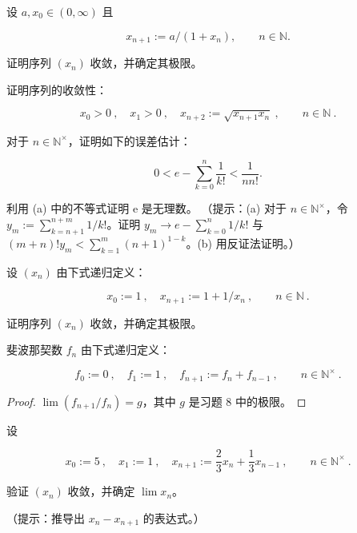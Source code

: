 \begin{exercises}
\item[5.]

设  $ a, x_0 \in (0, \infty) $ 且

\[
x_{n+1}:=a/(1+x_{n}),\qquad n\in\mathbb{N}.
\]

证明序列  $ (x_{n}) $ 收敛，并确定其极限。

\item[6.]

证明序列的收敛性：

\[
x_{0}>0~,\quad x_{1}>0~,\quad x_{n+2}:=\sqrt{x_{n+1}x_{n}}~,\qquad n\in\mathbb{N}~.
\]
\item[7.]

\begin{items}
\item

对于  $ n \in \mathbb{N}^\times $，证明如下的误差估计：

\[
0<e-\sum_{k=0}^{n}\frac{1}{k!}<\frac{1}{nn!}.
\]
\item

利用 (a) 中的不等式证明 e 是无理数。
（提示：(a) 对于  $ n \in \mathbb{N}^\times $，令  $ y_m := \sum_{k=n+1}^{n+m} 1/k! $。证明  $ y_m \to e - \sum_{k=0}^n 1/k! $ 与  $ (m+n)! y_m < \sum_{k=1}^m (n+1)^{1-k} $。(b) 用反证法证明。）

\end{items}

\item[8.]

设  $ (x_{n}) $ 由下式递归定义：

\[
x_{0}:=1~,\quad x_{n+1}:=1+1/x_{n}~,\qquad n\in\mathbb{N}~.
\]

证明序列  $ (x_{n}) $ 收敛，并确定其极限。

\item[9.]

斐波那契数  $ f_{n} $ 由下式递归定义：

\[
f_{0}:=0~,\quad f_{1}:=1~,\quad f_{n+1}:=f_{n}+f_{n-1}~,\qquad n\in\mathbb{N}^{\times}~.
\]
\end{exercises}

\begin{proof}

$ \lim(f_{n+1}/f_n) = g $，其中  $ g $ 是习题 8 中的极限。

\end{proof}

\begin{exercises}
\item[10.]

设

\[
x_{0}:=5~,\quad x_{1}:=1~,\quad x_{n+1}:=\frac{2}{3}x_{n}+\frac{1}{3}x_{n-1}~,\qquad n\in\mathbb{N}^{\times}~.
\]

验证  $ (x_{n}) $ 收敛，并确定  $ \lim x_{n} $。

（提示：推导出  $ x_{n} - x_{n+1} $ 的表达式。）

\end{exercises}

